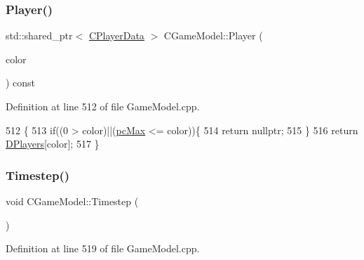 \subsubsection{\texorpdfstring{Player()}{Player()}}
{\footnotesize\ttfamily std\+::shared\+\_\+ptr$<$ \hyperlink{classCPlayerData}{C\+Player\+Data} $>$ C\+Game\+Model\+::\+Player (\begin{DoxyParamCaption}\item[{\hyperlink{GameDataTypes_8h_aafb0ca75933357ff28a6d7efbdd7602f}{E\+Player\+Color}}]{color }\end{DoxyParamCaption}) const}



Definition at line 512 of file Game\+Model.\+cpp.


\begin{DoxyCode}
512                                                                        \{
513     \textcolor{keywordflow}{if}((0 > color)||(\hyperlink{GameDataTypes_8h_aafb0ca75933357ff28a6d7efbdd7602fa594a5c8dd3987f24e8a0f23f1a72cd34}{pcMax} <= color))\{
514         \textcolor{keywordflow}{return} \textcolor{keyword}{nullptr};   
515     \}
516     \textcolor{keywordflow}{return} \hyperlink{classCGameModel_a524436c3560b10e1c6d6fdd0b66565dc}{DPlayers}[color];
517 \}
\end{DoxyCode}
\hypertarget{classCGameModel_a699325d41d7ff27bda47bfb3048cfd8f}{}\label{classCGameModel_a699325d41d7ff27bda47bfb3048cfd8f} 
\subsubsection{\texorpdfstring{Timestep()}{Timestep()}}
{\footnotesize\ttfamily void C\+Game\+Model\+::\+Timestep (\begin{DoxyParamCaption}{ }\end{DoxyParamCaption})}



Definition at line 519 of file Game\+Model.\+cpp.


